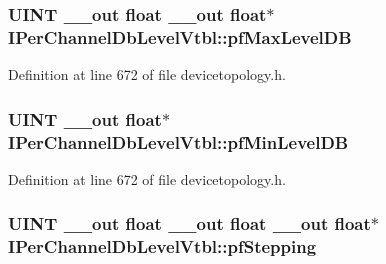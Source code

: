 \subsubsection[{\texorpdfstring{pf\+Max\+Level\+DB}{pfMaxLevelDB}}]{ {\bf U\+I\+NT} {\bf \+\_\+\+\_\+out} float {\bf \+\_\+\+\_\+out} float$\ast$ I\+Per\+Channel\+Db\+Level\+Vtbl\+::pf\+Max\+Level\+DB}\hypertarget{struct_i_per_channel_db_level_vtbl_af650b533957b678679fa268532c66b89}{}\label{struct_i_per_channel_db_level_vtbl_af650b533957b678679fa268532c66b89}


Definition at line 672 of file devicetopology.\+h.

\subsubsection[{\texorpdfstring{pf\+Min\+Level\+DB}{pfMinLevelDB}}]{ {\bf U\+I\+NT} {\bf \+\_\+\+\_\+out} float$\ast$ I\+Per\+Channel\+Db\+Level\+Vtbl\+::pf\+Min\+Level\+DB}\hypertarget{struct_i_per_channel_db_level_vtbl_ae658285790b7bc0f64ac53f1d105a22f}{}\label{struct_i_per_channel_db_level_vtbl_ae658285790b7bc0f64ac53f1d105a22f}


Definition at line 672 of file devicetopology.\+h.

\subsubsection[{\texorpdfstring{pf\+Stepping}{pfStepping}}]{ {\bf U\+I\+NT} {\bf \+\_\+\+\_\+out} float {\bf \+\_\+\+\_\+out} float {\bf \+\_\+\+\_\+out} float$\ast$ I\+Per\+Channel\+Db\+Level\+Vtbl\+::pf\+Stepping}\hypertarget{struct_i_per_channel_db_level_vtbl_ac4ffba3347c3456150477ea5120e2b48}{}\label{struct_i_per_channel_db_level_vtbl_ac4ffba3347c3456150477ea5120e2b48}


